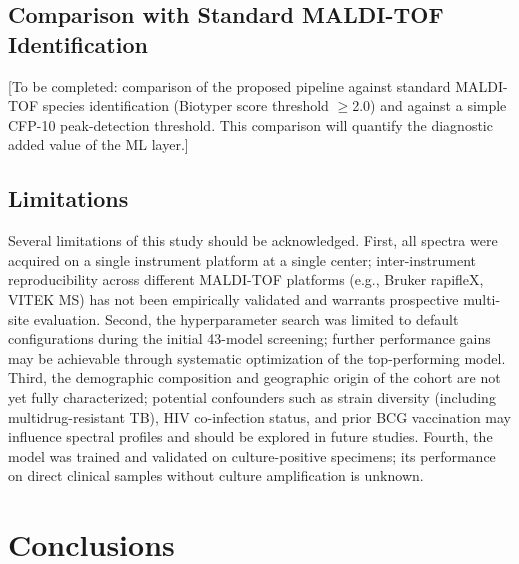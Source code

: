 \documentclass[journal=ancham, manuscript=article, layout=traditional]{achemso}
\begin{document}
\subsection{Comparison with Standard MALDI-TOF Identification}

[To be completed: comparison of the proposed pipeline against
standard MALDI-TOF species identification (Biotyper score threshold
$\geq$2.0) and against a simple CFP-10 peak-detection threshold.
This comparison will quantify the diagnostic added value of the
ML layer.]

\subsection{Limitations}

Several limitations of this study should be acknowledged.
First, all spectra were acquired on a single instrument platform
at a single center; inter-instrument reproducibility across different
MALDI-TOF platforms (e.g., Bruker rapifleX, VITEK MS) has not been
empirically validated and warrants prospective multi-site
evaluation.
Second, the hyperparameter search was limited to default
configurations during the initial 43-model screening; further
performance gains may be achievable through systematic optimization
of the top-performing model.
Third, the demographic composition and geographic origin of the cohort
are not yet fully characterized; potential confounders such as
strain diversity (including multidrug-resistant TB), HIV co-infection
status, and prior BCG vaccination may influence spectral profiles
and should be explored in future studies.
Fourth, the model was trained and validated on culture-positive
specimens; its performance on direct clinical samples without culture
amplification is unknown.

\section{Conclusions}
\end{document}
